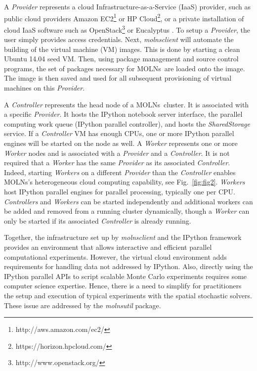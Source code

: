 \documentclass[final,leqno,onefignum,onetabnum]{siamltex1213}
\def\packagename {MOLNs}
\begin{document}
A \emph{Provider} represents a cloud Infrastructure-as-a-Service (IaaS) provider, such as public cloud providers Amazon EC2\footnote{http://aws.amazon.com/ec2/} or HP Cloud\footnote{https://horizon.hpcloud.com/}, or a private installation of cloud IaaS software such as OpenStack\footnote{http://www.openstack.org/} or Eucalyptus \cite{eucalyptus}. To setup a \emph{Provider}, the user simply provides access credentials. Next, \emph{molnsclient} will automate the building of the virtual machine (VM) images.  This is done by starting a clean Ubuntu 14.04 seed VM. Then, using package management and source control programs, 
the set of packages necessary for \packagename~are loaded onto the image.  The image is then saved and used for all subsequent provisioning of virtual machines on this \emph{Provider}. 

A \emph{Controller} represents the head node of a \packagename~cluster. It is associated with a specific \emph{Provider}. It hosts the IPython notebook server interface, the parallel computing work queue (IPython parallel  controller), and hosts the \emph{SharedStorage} service.
If a \emph{Controller} VM has enough CPUs, one or more IPython parallel engines will be started on the node as well.
A \emph{Worker} represents one or more \emph{Worker} nodes and is associated with a \emph{Provider} and a \emph{Controller}.  It is not required that a \emph{Worker} has the same \emph{Provider} as its associated \emph{Controller}.  Indeed, starting \emph{Workers} on a different \emph{Provider} than the \emph{Controller} enables \packagename's heterogeneous cloud computing capability, see Fig.~\ref{fig:fig2}. \emph{Workers} host IPython parallel engines for parallel processing, typically one per CPU.  \emph{Controllers} and \emph{Workers} can be started independently and additional workers can be added and removed from a running cluster dynamically, though a \emph{Worker} can only be started if its associated \emph{Controller} is already running.

Together, the infrastructure set up by \emph{molnsclient} and the IPython framework provides an environment that allows interactive and efficient parallel computational experiments. However, the virtual cloud environment adds requirements for handling data not addressed by IPython. Also, directly using the IPython parallel APIs to script scalable Monte Carlo experiments requires some computer science expertise. Hence, there is a need to simplify for practitioners the setup and execution of typical experiments with the spatial stochastic solvers. These issue are addressed by the \emph{molnsutil} package.    
\end{document}
